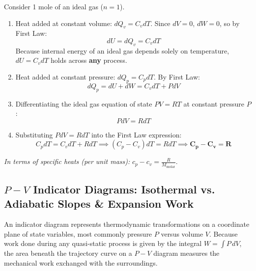\documentclass[10pt,twoside,openright]{book}
\begin{document}
\begin{formulabox}[Mayer's Relation Derivation: $C_p - C_v = R$]
Consider 1 mole of an ideal gas ($n=1$).
\begin{enumerate}
  \item Heat added at constant volume: $dQ_v = C_v dT$. Since $dV = 0$, $dW = 0$, so by First Law:
  \begin{equation}
    dU = dQ_v = C_v dT
  \end{equation}
  Because internal energy of an ideal gas depends solely on temperature, $dU = C_v dT$ holds across \textbf{any} process.
  \item Heat added at constant pressure: $dQ_p = C_p dT$. By First Law:
  \begin{equation}
    dQ_p = dU + dW = C_v dT + P dV
  \end{equation}
  \item Differentiating the ideal gas equation of state $P V = R T$ at constant pressure $P$:
  \begin{equation}
    P dV = R dT
  \end{equation}
  \item Substituting $P dV = R dT$ into the First Law expression:
  \begin{equation}
    C_p dT = C_v dT + R dT \implies (C_p - C_v) dT = R dT \implies \mathbf{C_p - C_v = R}
  \end{equation}
\end{enumerate}
\textit{In terms of specific heats (per unit mass):} $c_p - c_v = \frac{R}{M_{\text{molar}}}$.
\end{formulabox}

\subsection{$P-V$ Indicator Diagrams: Isothermal vs. Adiabatic Slopes \& Expansion Work}
An indicator diagram represents thermodynamic transformations on a coordinate plane of state variables, most commonly pressure $P$ versus volume $V$. Because work done during any quasi-static process is given by the integral $W = \int P\,dV$, the area beneath the trajectory curve on a $P-V$ diagram measures the mechanical work exchanged with the surroundings.
\end{document}

